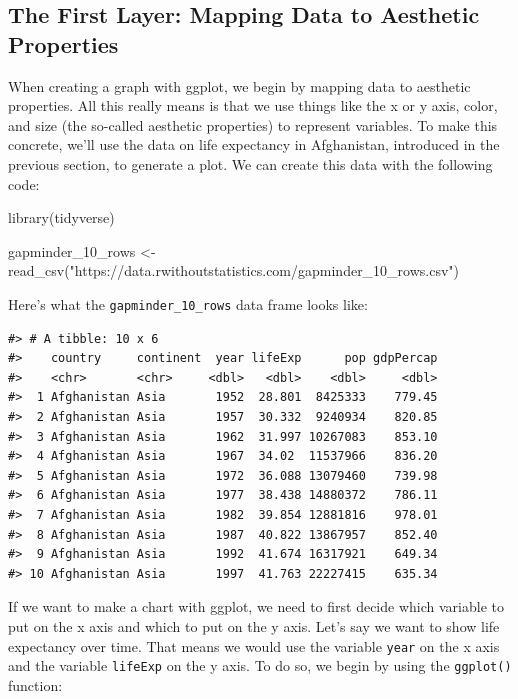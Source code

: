 \documentclass[
]{book}
\newenvironment{Shaded}{\begin{snugshade}}{\end{snugshade}}
\newcommand{\FunctionTok}[1]{\textcolor[rgb]{0.00,0.00,0.00}{#1}}
\newcommand{\NormalTok}[1]{#1}
\newcommand{\OtherTok}[1]{\textcolor[rgb]{0.56,0.35,0.01}{#1}}
\newcommand{\StringTok}[1]{\textcolor[rgb]{0.31,0.60,0.02}{#1}}
\begin{document}
\hypertarget{the-first-layer-mapping-data-to-aesthetic-properties}{%
\subsection*{The First Layer: Mapping Data to Aesthetic Properties}\label{the-first-layer-mapping-data-to-aesthetic-properties}}

When creating a graph with ggplot, we begin by mapping data to aesthetic properties. All this really means is that we use things like the x or y axis, color, and size (the so-called aesthetic properties) to represent variables. To make this concrete, we'll use the data on life expectancy in Afghanistan, introduced in the previous section, to generate a plot. We can create this data with the following code:

\begin{Shaded}
\begin{Highlighting}[]
\FunctionTok{library}\NormalTok{(tidyverse)}

\NormalTok{gapminder\_10\_rows }\OtherTok{\textless{}{-}} \FunctionTok{read\_csv}\NormalTok{(}\StringTok{"https://data.rwithoutstatistics.com/gapminder\_10\_rows.csv"}\NormalTok{)}
\end{Highlighting}
\end{Shaded}

Here's what the \texttt{gapminder\_10\_rows} data frame looks like:

\begin{verbatim}
#> # A tibble: 10 x 6
#>    country     continent  year lifeExp      pop gdpPercap
#>    <chr>       <chr>     <dbl>   <dbl>    <dbl>     <dbl>
#>  1 Afghanistan Asia       1952  28.801  8425333    779.45
#>  2 Afghanistan Asia       1957  30.332  9240934    820.85
#>  3 Afghanistan Asia       1962  31.997 10267083    853.10
#>  4 Afghanistan Asia       1967  34.02  11537966    836.20
#>  5 Afghanistan Asia       1972  36.088 13079460    739.98
#>  6 Afghanistan Asia       1977  38.438 14880372    786.11
#>  7 Afghanistan Asia       1982  39.854 12881816    978.01
#>  8 Afghanistan Asia       1987  40.822 13867957    852.40
#>  9 Afghanistan Asia       1992  41.674 16317921    649.34
#> 10 Afghanistan Asia       1997  41.763 22227415    635.34
\end{verbatim}

If we want to make a chart with ggplot, we need to first decide which variable to put on the x axis and which to put on the y axis. Let's say we want to show life expectancy over time. That means we would use the variable \texttt{year} on the x axis and the variable \texttt{lifeExp} on the y axis. To do so, we begin by using the \texttt{ggplot()} function:
\end{document}
